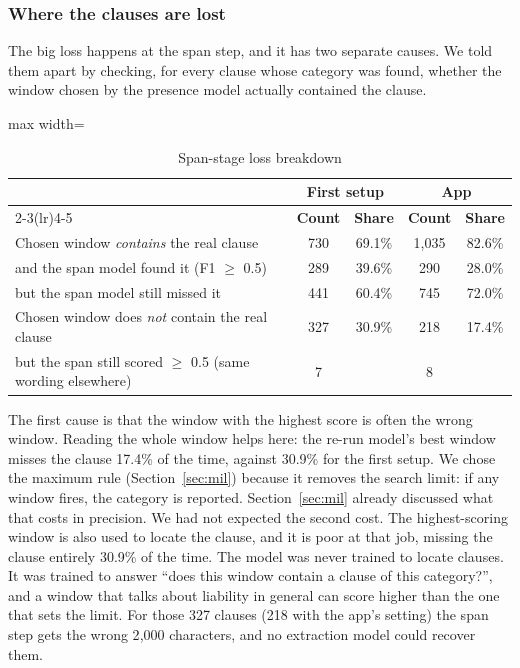 \subsubsection{Where the clauses are lost}
The big loss happens at the span step, and it has two separate causes. We told them apart by checking, for every clause whose category was found, whether the window chosen by the presence model actually contained the clause.

\begin{table}[!htbp]
\centering
\caption{Span-stage loss breakdown}
\label{tab:e2eattr}
\small
\begin{adjustbox}{max width=\textwidth}
\begin{tabular}{lcccc}
\toprule
 & \multicolumn{2}{c}{\textbf{First setup}} & \multicolumn{2}{c}{\textbf{App}}\\
\cmidrule(lr){2-3}\cmidrule(lr){4-5}
 & \textbf{Count} & \textbf{Share} & \textbf{Count} & \textbf{Share}\\
\midrule
Chosen window \emph{contains} the real clause & 730 & 69.1\% & 1{,}035 & 82.6\%\\
\quad and the span model found it (F1 $\geq$ 0.5) & 289 & 39.6\% & 290 & 28.0\%\\
\quad but the span model still missed it & 441 & 60.4\% & 745 & 72.0\%\\
Chosen window does \emph{not} contain the real clause & 327 & 30.9\% & 218 & 17.4\%\\
\quad but the span still scored $\geq$ 0.5 (same wording elsewhere) & 7 & & 8 & \\
\bottomrule
\end{tabular}
\end{adjustbox}
\end{table}

The first cause is that the window with the highest score is often the wrong window. Reading the whole window helps here: the re-run model's best window misses the clause 17.4\% of the time, against 30.9\% for the first setup. We chose the maximum rule (Section~\ref{sec:mil}) because it removes the search limit: if any window fires, the category is reported. Section~\ref{sec:mil} already discussed what that costs in precision. We had not expected the second cost. The highest-scoring window is also used to locate the clause, and it is poor at that job, missing the clause entirely 30.9\% of the time. The model was never trained to locate clauses. It was trained to answer ``does this window contain a clause of this category?'', and a window that talks about liability in general can score higher than the one that sets the limit. For those 327 clauses (218 with the app's setting) the span step gets the wrong 2{,}000 characters, and no extraction model could recover them.

